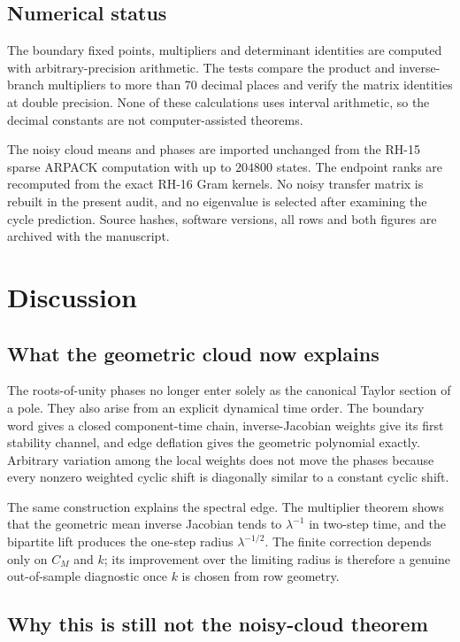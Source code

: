 \documentclass[11pt]{article}
\theoremstyle{definition}
\theoremstyle{remark}
\begin{document}
\subsection{Numerical status}

The boundary fixed points, multipliers and determinant identities are
computed with arbitrary-precision arithmetic.  The tests compare the product
and inverse-branch multipliers to more than 70 decimal places and verify the
matrix identities at double precision.  None of these calculations uses
interval arithmetic, so the decimal constants are not computer-assisted
theorems.

The noisy cloud means and phases are imported unchanged from the RH-15 sparse
ARPACK computation with up to $204800$ states.  The endpoint ranks are
recomputed from the exact RH-16 Gram kernels.  No noisy transfer matrix is
rebuilt in the present audit, and no eigenvalue is selected after examining
the cycle prediction.  Source hashes, software versions, all rows and both
figures are archived with the manuscript.

\section{Discussion}
\label{sec:discussion}

\subsection{What the geometric cloud now explains}

The roots-of-unity phases no longer enter solely as the canonical Taylor
section of a pole.  They also arise from an explicit dynamical time order.
The boundary word gives a closed component-time chain, inverse-Jacobian
weights give its first stability channel, and edge deflation gives the
geometric polynomial exactly.  Arbitrary variation among the local weights
does not move the phases because every nonzero weighted cyclic shift is
diagonally similar to a constant cyclic shift.

The same construction explains the spectral edge.  The multiplier theorem
shows that the geometric mean inverse Jacobian tends to $\lambda^{-1}$ in
two-step time, and the bipartite lift produces the one-step radius
$\lambda^{-1/2}$.  The finite correction depends only on $C_M$ and $k$; its
improvement over the limiting radius is therefore a genuine out-of-sample
diagnostic once $k$ is chosen from row geometry.

\subsection{Why this is still not the noisy-cloud theorem}
\end{document}
